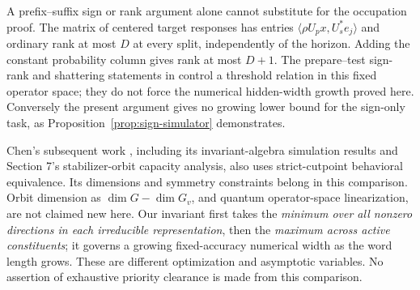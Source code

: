 A prefix--suffix sign or rank argument alone cannot substitute for
the occupation proof. The matrix of centered target responses has
entries $\langle \rho U_px,U_s^*e_j\rangle$ and ordinary rank at most
$D$ at every split, independently of the horizon. Adding the constant
probability column gives rank at most $D+1$. The prepare--test
sign-rank and shattering statements in \cite{CWmay} control a
threshold relation in this fixed operator space; they do not force
the numerical hidden-width growth proved here. Conversely the present
argument gives no growing lower bound for the sign-only task, as
Proposition~\ref{prop:sign-simulator} demonstrates.

Chen's subsequent work \cite{ChenSep}, including its invariant-algebra
simulation results and Section 7's stabilizer-orbit capacity analysis,
also uses strict-cutpoint behavioral equivalence. Its dimensions and
symmetry constraints belong in this comparison. Orbit dimension as
$\dim G-\dim G_v$, and quantum operator-space linearization, are not
claimed new here. Our invariant first takes the \emph{minimum over all
nonzero directions in each irreducible representation}, then the
\emph{maximum across active constituents}; it governs a growing
fixed-accuracy numerical width as the word length grows. These are
different optimization and asymptotic variables. No assertion of
exhaustive priority clearance is made from this comparison.
